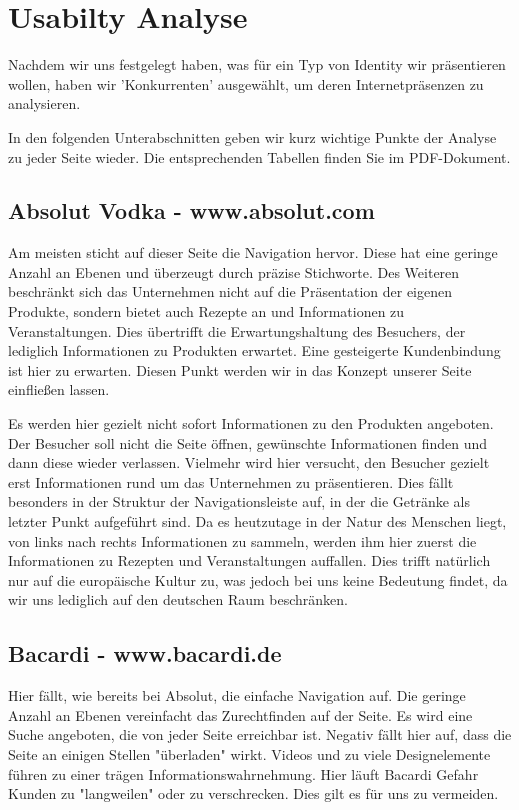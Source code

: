 \documentclass[12pt,a4paper,oneside,ngerman]{article}
\begin{document}
\section{Usabilty Analyse} %
Nachdem wir uns festgelegt haben, was für ein Typ von Identity wir präsentieren wollen, haben wir 'Konkurrenten' ausgewählt, um deren Internetpräsenzen zu analysieren. 

In den folgenden Unterabschnitten geben wir kurz wichtige Punkte der Analyse zu jeder Seite wieder. Die entsprechenden Tabellen finden Sie im PDF-Dokument. %

\subsection{Absolut Vodka - www.absolut.com} %
Am meisten sticht auf dieser Seite die Navigation hervor. Diese hat eine geringe Anzahl an Ebenen und überzeugt durch präzise Stichworte. Des Weiteren beschränkt sich das Unternehmen nicht auf die Präsentation der eigenen Produkte, sondern bietet auch Rezepte an und Informationen zu Veranstaltungen. Dies übertrifft die Erwartungshaltung des Besuchers, der lediglich Informationen zu Produkten erwartet. Eine gesteigerte Kundenbindung ist hier zu erwarten. Diesen Punkt werden wir in das Konzept unserer Seite einfließen lassen.

Es werden hier gezielt nicht sofort Informationen zu den Produkten angeboten. Der Besucher soll nicht die Seite öffnen, gewünschte Informationen finden und dann diese wieder verlassen. Vielmehr wird hier versucht, den Besucher gezielt erst Informationen rund um das Unternehmen zu präsentieren. Dies fällt besonders in der Struktur der Navigationsleiste auf, in der die Getränke als letzter Punkt aufgeführt sind. Da es heutzutage in der Natur des Menschen liegt, von links nach rechts Informationen zu sammeln, werden ihm hier zuerst die Informationen zu Rezepten und Veranstaltungen auffallen. Dies trifft natürlich nur auf die europäische Kultur zu, was jedoch bei uns keine Bedeutung findet, da wir uns lediglich auf den deutschen Raum beschränken.

\subsection{Bacardi - www.bacardi.de} %
Hier fällt, wie bereits bei Absolut, die einfache Navigation auf. Die geringe Anzahl an Ebenen vereinfacht das Zurechtfinden auf der Seite. Es wird eine Suche angeboten, die von jeder Seite erreichbar ist. Negativ fällt hier auf, dass die Seite an einigen Stellen "überladen" wirkt. Videos und zu viele Designelemente führen zu einer trägen Informationswahrnehmung. Hier läuft Bacardi Gefahr Kunden zu "langweilen" oder zu verschrecken. Dies gilt es für uns zu vermeiden.
\end{document}
